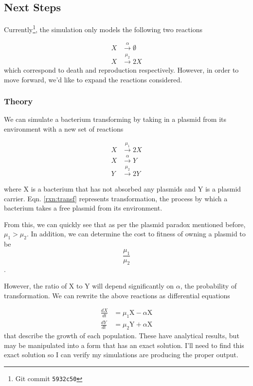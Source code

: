 \documentclass[oneside]{labbook}
\newcommand{\commit}[1]{\footnote{Git commit \texttt{#1}}}
\newcommand{\reaction}[4][]{
  \begin{equation}
  #2 \overset{#4}{\rightarrow} #3
  \end{equation}}
\newcommand{\lreaction}[4]{
  \begin{equation}
  #2 \overset{#4}{\rightarrow} #3
  \end{equation}}
\begin{document}
\subsection*{Next Steps}

Currently\commit{5932c50}, the simulation only models the following two reactions

\begin{align}
  X & \overset{\alpha}{\rightarrow} \emptyset\\
  X & \overset{\mu_2}{\rightarrow} 2X
\end{align}
which correspond to death and reproduction respectively. However, in order to
move forward, we'd like to expand the reactions considered.

\subsubsection{Theory}

We can simulate a bacterium transforming by taking in a plasmid from its
environment with a new set of reactions


\begin{align}
  X & \overset{\mu_1}{\rightarrow} 2X \label{rxn:x_birth}\\
  X & \overset{\alpha}{\rightarrow} Y \label{rxn:transf}\\
  Y & \overset{\mu_2}{\rightarrow} 2Y \label{rxn:y_birth}
\end{align}

where X is a bacterium that has not absorbed any plasmids and Y is a plasmid
carrier. Eqn. \ref{rxn:transf} represents transformation, the
process by which a bacterium takes a free plasmid from its environment.

From this, we can quickly see that as per the plasmid paradox mentioned before,
$\mu_1 > \mu_2$. In addition, we can determine the cost to fitness of owning a
plasmid to be
\begin{equation}
\frac{\mu_1}{\mu_2}
\end{equation}.

However, the ratio of X to Y will depend significantly on $\alpha$, the probability
of transformation. We can rewrite the above reactions as differential equations

\begin{align}
  \frac{dX}{dt} & = \mu_1 \text{X} - \alpha \text{X} \label{eq:x_pop}\\
  \frac{dY}{dt} & = \mu_2 \text{Y} + \alpha \text{X} \label{eq:y_pop}
\end{align}
that describe the growth of each population. These have analytical results, but
may be manipulated into a form that has an exact solution. I'll need to find this
exact solution so I can verify my simulations are producing the proper output.
\end{document}
